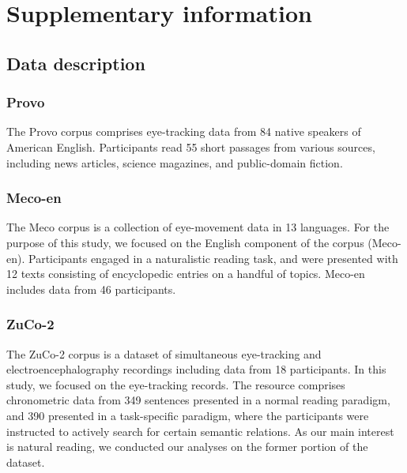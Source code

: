 \documentclass[11pt]{article}
\begin{document}
\newpage

\appendix

\section{Supplementary information}

\subsection{Data description}
\label{sec:appendix-datasets}

\subsubsection{Provo}
The Provo corpus \citep{provo} comprises eye-tracking data from 84 native speakers of American English. Participants read 55 short passages from various sources, including news articles, science magazines, and public-domain fiction. %

\subsubsection{Meco-en}

The Meco corpus \citep{mecol1} is a collection of eye-movement data in 13 languages. For the purpose of this study, we focused on the English component of the corpus (Meco-en). Participants engaged in a naturalistic reading task, and were presented with 12 texts consisting of encyclopedic entries on a handful of topics. Meco-en includes data from 46 participants. %

\subsubsection{ZuCo-2}

The ZuCo-2 corpus \citep{hollenstein2020zuco} is a dataset of simultaneous eye-tracking and electroencephalography recordings including data from 18 participants. In this study, we focused on the eye-tracking records. The resource comprises chronometric data from 349 sentences presented in a normal reading paradigm, and 390 presented in a task-specific paradigm, where the participants were instructed to actively search for certain semantic relations. As our main interest is natural reading, we conducted our analyses on the former portion of the dataset.
\end{document}
